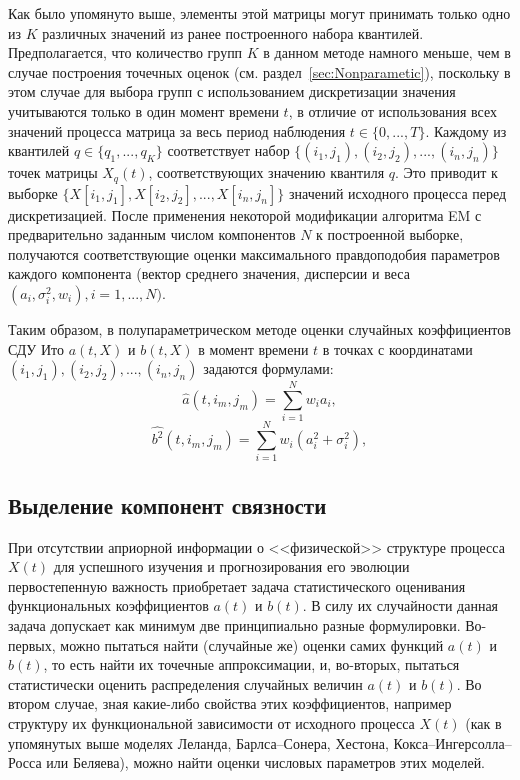 Как было упомянуто выше, элементы этой матрицы могут принимать только одно из $K$ различных значений из ранее построенного набора квантилей. Предполагается, что количество групп $K$ в данном методе намного меньше, чем в случае построения точечных оценок (см. раздел~\ref{sec:Nonparametic}), поскольку в этом случае для выбора групп с использованием дискретизации значения учитываются только в один момент времени $t$, в отличие от использования всех значений процесса матрица за весь период наблюдения $t \in \{0,...,T\}$. Каждому из квантилей $q \in \{q_1,..., q_K\}$ соответствует набор $\{(i_1, j_1), (i_2, j_2),..., (i_n, j_n)\}$ точек матрицы $X_q(t)$, соответствующих значению квантиля $q$. Это приводит к выборке $\{X[i_1,j_1 ], X[i_2,j_2 ],...,X[i_n,j_n]\}$ значений исходного процесса перед дискретизацией. После применения некоторой модификации алгоритма EM с предварительно заданным числом компонентов $N$ к построенной выборке, получаются соответствующие оценки максимального правдоподобия параметров каждого компонента (вектор среднего значения, дисперсии и веса $(a_i,\sigma_i^2, w_i), i=1,...,N)$.


Таким образом, в полупараметрическом методе оценки случайных коэффициентов СДУ Ито $a(t, X)$ и $b(t,X)$ в момент времени $t$ в точках с координатами $(i_1, j_1), (i_2,j_2),..., (i_n, j_n)$ задаются формулами:
$$
\hat{a}(t, i_m, j_m) = \sum\limits_{i=1}^N w_i a_i,
$$
$$
\hat{b^2}(t, i_m, j_m) = \sum\limits_{i=1}^N w_i (a_i^2 + \sigma_i^2),
$$
\subsection{Выделение компонент связности}
\label{sec:Components}
При отсутствии априорной информации о <<физической>> структуре процесса $X(t)$ для успешного изучения и прогнозирования его эволюции первостепенную важность приобретает задача  статистического оценивания функциональных коэффициентов $a(t)$ и $b(t)$. В силу их случайности данная задача допускает как минимум две принципиально разные формулировки. Во-первых, можно пытаться найти (случайные же) оценки самих функций $a(t)$ и $b(t)$, то есть найти их точечные аппроксимации, и, во-вторых, пытаться статистически оценить распределения случайных величин $a(t)$ и $b(t)$. Во втором случае, зная какие-либо свойства этих коэффициентов, например структуру их функциональной зависимости от исходного процесса $X(t)$ (как в упомянутых выше моделях Леланда, Барлса--Сонера, Хестона, Кокса--Ингерсолла--Росса или Беляева), можно найти оценки числовых параметров этих моделей.

